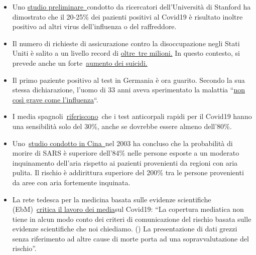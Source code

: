 \begin{itemize}
\tightlist
\item
  Uno
  \href{https://medium.com/@nigam/higher-co-infection-rates-in-covid19-b24965088333}{studio
  preliminare~}condotto da ricercatori dell'Università di Stanford ha
  dimostrato che il 20-25\% dei pazienti positivi al Covid19 è risultato
  inoltre positivo ad altri virus dell'influenza o del raffreddore.
\item
  Il numero di richieste di assicurazione contro la disoccupazione negli
  Stati Uniti è salito a un livello record di
  \href{https://www.businessinsider.com/us-weekly-jobless-claims-record-coronavirus-unemployment-insurance-labor-recession-2020-3}{oltre~tre
  milioni.} In questo contesto, si prevede anche un
  forte~\href{https://twitter.com/KoenSwinkels/status/1243066532390977544}{aumento
  dei suicidi.}
\item
  Il primo paziente positivo al test in Germania è ora guarito. Secondo
  la sua stessa dichiarazione, l'uomo di 33 anni aveva sperimentato la
  malattia
  ``\href{https://www.br.de/nachrichten/bayern/coronavirus-patient-nummer-1-wie-ich-die-quarantaene-erlebte,Rrm4Ul8}{non
  così grave come l'influenza}``.
\item
  I media
  spagnoli~\href{https://elpais.com/sociedad/2020-03-25/los-test-rapidos-de-coronavirus-comprados-en-china-no-funcionan.html}{riferiscono}~che
  i test anticorpali rapidi per il Covid19 hanno una sensibilità solo
  del 30\%, anche se dovrebbe essere almeno dell'80\%.
\item
  Uno~\href{https://ehjournal.biomedcentral.com/articles/10.1186/1476-069X-2-15}{studio
  condotto in Cina~}nel 2003 ha concluso che la probabilità di morire di
  SARS è superiore dell'84\% nelle persone esposte a un moderato
  inquinamento dell'aria rispetto ai pazienti provenienti da regioni con
  aria pulita. Il rischio è addirittura superiore del 200\% tra le
  persone provenienti da aree con aria fortemente inquinata.
\item
  La rete tedesca per la medicina basata sulle evidenze scientifiche
  (EbM)~\href{https://www.ebm-netzwerk.de/en/publications/covid-19}{critica
  il lavoro dei media}sul Covid19: ``La copertura mediatica non tiene in
  alcun modo conto dei criteri di comunicazione del rischio basata sulle
  evidenze scientifiche che noi chiediamo. () La presentazione di dati
  grezzi senza riferimento ad altre cause di morte porta ad una
  sopravvalutazione del rischio''.
\end{itemize}

